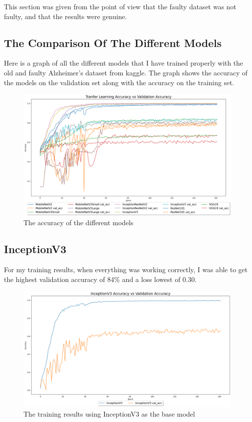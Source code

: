 \documentclass[]{final_report}
\begin{document}
This section was given from the point of view that the faulty dataset was not faulty, and that the results were genuine.

\subsection{The Comparison Of The Different Models}
Here is a graph of all the different models that I have trained properly with the old and faulty Alzheimer's dataset from kaggle.
The graph shows the accuracy of the models on the validation set along with the accuracy on the training set.
\begin{figure}[h]
  \centering
  \includegraphics[width=1\textwidth]{images/good-training-acc-vs-val.png}
  \caption{The accuracy of the different models}
  \label{fig:loss}
\end{figure}
\pagebreak

\subsection{InceptionV3}
For my training results, when everything was working correctly, I was able to get the highest validation accuracy of 84\% and a loss lowest of 0.30.
\begin{figure}[ht!]
  \centering
  \includegraphics[width=120mm]{images/inceptionv3-accuracy-vs-val-acc.png}
  \caption{The training results using InceptionV3\cite{DBLP:journals/corr/SzegedyVISW15} as the base model}
\end{figure}
\end{document}
